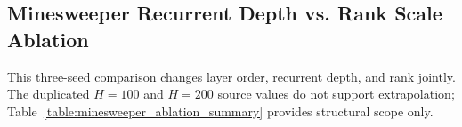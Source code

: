 \subsection{Minesweeper Recurrent Depth vs. Rank Scale Ablation}
\label{app:minesweeper_ablation}
This three-seed comparison changes layer order, recurrent depth, and rank jointly. The duplicated $H=100$ and $H=200$ source values do not support extrapolation; Table~\ref{table:minesweeper_ablation_summary} provides structural scope only.

\begin{table}[htbp]
\caption{\textbf{Minesweeper Structural Ablation Study ($15\text{M}$ steps, $T=64$).} Evaluation normalized scores at $H=100$ and $H=200$, plus execution throughput (SPS). The identical source values provide structural scope rather than length-extrapolation evidence.}
\label{table:minesweeper_ablation_summary}
\vskip 0.1in
\begin{center}
\begin{small}
\end{small}
\end{center}
\end{table}

